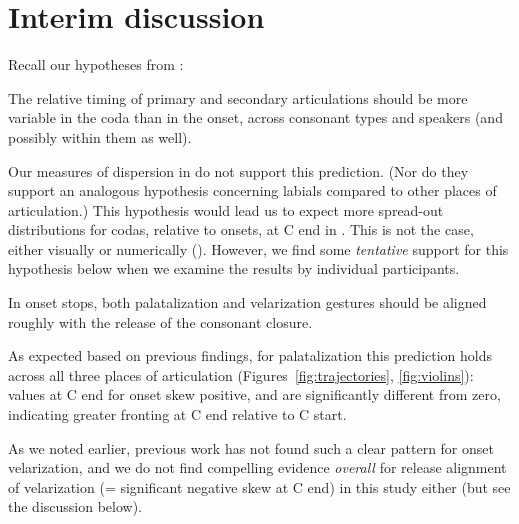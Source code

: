 \documentclass[output=paper,colorlinks,citecolor=brown]{langscibook}
\newcommand{\pal}{\ipa{ʲ}}
\begin{document}



\section{Interim discussion}\label{sec:interim}
Recall our hypotheses from :

\begin{exe}
The relative timing of primary and secondary articulations should be more variable in the coda than in the onset, across consonant types and speakers (and possibly within them as well). 
\end{exe}

Our measures of dispersion in  do not support this prediction. (Nor do they support an analogous hypothesis concerning labials compared to other places of articulation.) This hypothesis would lead us to expect more spread-out distributions for codas, relative to onsets, at C end in . This is not the case, either visually or numerically (). However, we find some \emph{tentative} support for this hypothesis below when we examine the results by individual participants.

\begin{exe}
 In onset stops, both palatalization and velarization gestures should be aligned roughly with the release of the consonant closure. 
\end{exe}

As expected based on previous findings, for palatalization this prediction holds across all three places of articulation (Figures~\ref{fig:trajectories}, \ref{fig:violins}): values at C end for onset \ipa{/P\pal\ T\pal\ K\pal/} skew positive, and are significantly different from zero, indicating greater fronting at C end relative to C start.

As we noted earlier, previous work has not found such a clear pattern for onset velarization, and we do not find compelling evidence \emph{overall} for release alignment of velarization (= significant negative skew at C end) in this study either (but see the discussion below).
\end{document}
